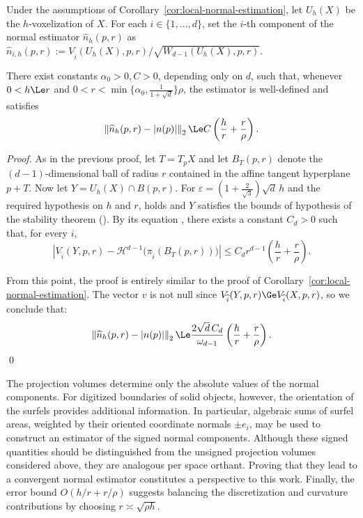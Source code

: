 \begin{corollary}%
\label{cor:cubical-normal-estimation}
Under the assumptions of Corollary~\ref{cor:local-normal-estimation},
let $U_h(X)$ be the $h$-voxelization of $X$.  For each
$i\in\{1,\ldots,d\}$, set the $i$-th component of the normal estimator
$\widehat{n}_{h}(p,r)$ as $\widehat{n}_{i,h}(p,r):=
V_{\widehat{i}}(U_h(X),p,r)/\sqrt{W_{d-1}(U_h(X),p,r)}$.
 

There exist constants $\alpha_0>0,C>0$, depending only on $d$, such
that, whenever $0 < h \Le r$ and $0 < r < \min \{ \alpha_0,
\frac{1}{1+\sqrt{d}} \} \rho$, the estimator is well-defined and
satisfies
\[
\left\|\widehat{n}_h(p,r)-|n(p)|\right\|_2
\Le C \left(\frac{h}{r}+\frac{r}{\rho} \right).
\]
\end{corollary}

\begin{proof}
  As in the previous proof, let $T=T_pX$ and let $B_T(p,r)$ denote the
  $(d-1)$-dimensional ball of radius $r$
  contained in the affine tangent hyperplane
  $p+T$. Now let $Y=U_h(X) \cap B(p,r)$. For $\varepsilon=\left(1+\frac{2}{\sqrt3}\right)\sqrt d\,h$ and the required hypothesis on $h$ and $r$,  holds and $Y$ satisfies the bounds of hypothesis  of the stability theorem (). 
  By its equation , there exists a
constant $C_d>0$ such that, for every $i$,
\[
\left|
V_{\widehat{i}}(Y,p,r)
- \mathcal H^{d-1}
\bigl(\pi_{\widehat i}(B_T(p,r))\bigr)
\right|
\le
C_d r^{d-1}\left(\frac{h}{r}+\frac{r}{\rho}\right).
\]

From this point, the proof is entirely similar to the proof of Corollary~\ref{cor:local-normal-estimation}. The vector $v$ is not null since $V_{\widehat{i}}(Y,p,r) \Ge V_{\widehat{i}}(X,p,r)$, so we conclude that:
\[
\left\|\widehat n_h(p,r)-|n(p)|\right\|_2
\Le \frac{2\sqrt d\,C_d}{\omega_{d-1}}
\left(\frac{h}{r}+\frac{r}{\rho}\right).
\]
\qed
\end{proof}


\begin{remark}
The projection volumes determine only the absolute values
of the normal components.
%
For digitized boundaries of solid objects, however, the orientation of
the surfels provides additional information.  In particular, algebraic
sums of surfel areas, weighted by their oriented coordinate normals
$\pm e_i$, may be used to construct an estimator of the signed normal
components. Although these signed quantities should be distinguished
from the unsigned projection volumes considered above, they are
analogous per space orthant. Proving that they lead to a convergent
normal estimator constitutes a perspective to this work.
%
Finally, the error bound
$O(h/r+r/\rho)$ suggests balancing the discretization
and curvature contributions by choosing
$r\asymp\sqrt{\rho h}$.
\end{remark}

